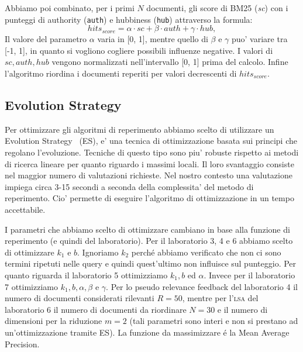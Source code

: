 Abbiamo poi combinato, per i primi $N$ documenti, gli score di BM25 (\textit{sc}) con i punteggi di authority (\texttt{auth}) e hubbiness (\texttt{hub}) attraverso la formula:
\[ hits_{score} =  \alpha \cdot sc + \beta \cdot auth + \gamma \cdot hub,\]
Il valore del parametro $\alpha$ varia in [0, 1],  mentre quello di $\beta$ e $\gamma$ puo' variare tra [-1, 1], in quanto si vogliono cogliere possibili influenze negative. I valori di $sc, auth, hub$ vengono normalizzati nell'intervallo [0, 1] prima del calcolo. 
Infine l'algoritmo riordina i documenti reperiti per valori decrescenti di $hits_{score}$.


\subsection{Evolution Strategy}
\label{sec:es}

Per ottimizzare gli algoritmi di reperimento abbiamo scelto di utilizzare un Evolution Strategy~\cite{back1996evolutionary} (ES), e' una tecnica di ottimizzazione basata sui principi che regolano l'evoluzione. Tecniche di questo tipo sono piu' robuste rispetto ai metodi di ricerca lineare per quanto riguardo i massimi locali. Il loro svantaggio consiste nel maggior numero di valutazioni richieste. Nel nostro contesto una valutazione impiega circa 3-15 secondi a seconda della complessita' del metodo di reperimento. Cio' permette di eseguire l'algoritmo di ottimizzazione in un tempo accettabile.

I parametri che abbiamo scelto di ottimizzare cambiano in base alla funzione di reperimento (e quindi del laboratorio). Per il laboratorio 3, 4 e 6 abbiamo scelto di ottimizzare $k_1$ e $b$. Ignoriamo $k_2$ perch\'e abbiamo verificato che non ci sono termini ripetuti nelle query e quindi  quest'ultimo non influisce sul punteggio. Per quanto riguarda il laboratorio 5 ottimizziamo $k_1, b$ ed $\alpha$. Invece per il laboratorio 7 ottimizziamo $k_1, b, \alpha, \beta$ e $\gamma$. Per lo pseudo relevance feedback del laboratorio 4 il numero di documenti considerati rilevanti $R = 50$, mentre per l'\textsc{lsa} del laboratorio 6 il numero di documenti da riordinare $N = 30$ e il numero di dimensioni per la riduzione $m=2$ (tali parametri sono interi e non si prestano ad un'ottimizzazione tramite ES). La funzione da massimizzare \'e la Mean Average Precision.

